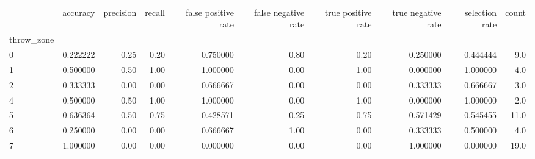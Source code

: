 \begin{tabular}{lrrrrrrrrr}
\toprule
{} &  accuracy &  precision &  recall &  false positive rate &  false negative rate &  true positive rate &  true negative rate &  selection rate &  count \\
throw\_zone &           &            &         &                      &                      &                     &                     &                 &        \\
\midrule
0          &  0.222222 &       0.25 &    0.20 &             0.750000 &                 0.80 &                0.20 &            0.250000 &        0.444444 &    9.0 \\
1          &  0.500000 &       0.50 &    1.00 &             1.000000 &                 0.00 &                1.00 &            0.000000 &        1.000000 &    4.0 \\
2          &  0.333333 &       0.00 &    0.00 &             0.666667 &                 0.00 &                0.00 &            0.333333 &        0.666667 &    3.0 \\
4          &  0.500000 &       0.50 &    1.00 &             1.000000 &                 0.00 &                1.00 &            0.000000 &        1.000000 &    2.0 \\
5          &  0.636364 &       0.50 &    0.75 &             0.428571 &                 0.25 &                0.75 &            0.571429 &        0.545455 &   11.0 \\
6          &  0.250000 &       0.00 &    0.00 &             0.666667 &                 1.00 &                0.00 &            0.333333 &        0.500000 &    4.0 \\
7          &  1.000000 &       0.00 &    0.00 &             0.000000 &                 0.00 &                0.00 &            1.000000 &        0.000000 &   19.0 \\
\bottomrule
\end{tabular}
